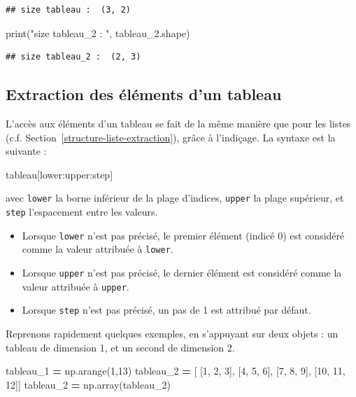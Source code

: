 \documentclass[
  12pt,
]{book}
\newenvironment{Shaded}{\begin{snugshade}}{\end{snugshade}}
\newcommand{\BuiltInTok}[1]{#1}
\newcommand{\DecValTok}[1]{\textcolor[rgb]{0.00,0.00,0.81}{#1}}
\newcommand{\NormalTok}[1]{#1}
\newcommand{\OperatorTok}[1]{\textcolor[rgb]{0.81,0.36,0.00}{\textbf{#1}}}
\newcommand{\StringTok}[1]{\textcolor[rgb]{0.31,0.60,0.02}{#1}}
\providecommand{\tightlist}{%
  \setlength{\itemsep}{0pt}\setlength{\parskip}{0pt}}
\numberwithin{equation}{section}
\numberwithin{countremarque}{section}
\begin{document}
\begin{lstlisting}
## size tableau :  (3, 2)
\end{lstlisting}

\begin{Shaded}
\begin{Highlighting}[]
\BuiltInTok{print}\NormalTok{(}\StringTok{"size tableau\_2 : "}\NormalTok{, tableau\_2.shape)}
\end{Highlighting}
\end{Shaded}

\begin{lstlisting}
## size tableau_2 :  (2, 3)
\end{lstlisting}

\subsection{Extraction des éléments d'un tableau}\label{extraction-des-uxe9luxe9ments-dun-tableau}

L'accès aux éléments d'un tableau se fait de la même manière que pour les listes (c.f. Section~\ref{structure-liste-extraction}), grâce à l'indiçage. La syntaxe est la suivante :

\begin{Shaded}
\begin{Highlighting}[]
\NormalTok{tableau[lower:upper:step]}
\end{Highlighting}
\end{Shaded}

avec \texttt{lower} la borne inférieur de la plage d'indices, \texttt{upper} la plage supérieur, et \texttt{step} l'espacement entre les valeurs.

\begin{itemize}
\tightlist
\item
  Lorsque \texttt{lower} n'est pas précisé, le premier élément (indicé 0) est considéré comme la valeur attribuée à \texttt{lower}.
\item
  Lorsque \texttt{upper} n'est pas précisé, le dernier élément est considéré comme la valeur attribuée à \texttt{upper}.
\item
  Lorsque \texttt{step} n'est pas précisé, un pas de 1 est attribué par défaut.
\end{itemize}

Reprenons rapidement quelques exemples, en s'appuyant sur deux objets : un tableau de dimension 1, et un second de dimension 2.

\begin{Shaded}
\begin{Highlighting}[]
\NormalTok{tableau\_1 }\OperatorTok{=}\NormalTok{ np.arange(}\DecValTok{1}\NormalTok{,}\DecValTok{13}\NormalTok{)}
\NormalTok{tableau\_2 }\OperatorTok{=}\NormalTok{ [ [}\DecValTok{1}\NormalTok{, }\DecValTok{2}\NormalTok{, }\DecValTok{3}\NormalTok{], [}\DecValTok{4}\NormalTok{, }\DecValTok{5}\NormalTok{, }\DecValTok{6}\NormalTok{], [}\DecValTok{7}\NormalTok{, }\DecValTok{8}\NormalTok{, }\DecValTok{9}\NormalTok{], [}\DecValTok{10}\NormalTok{, }\DecValTok{11}\NormalTok{, }\DecValTok{12}\NormalTok{]]}
\NormalTok{tableau\_2 }\OperatorTok{=}\NormalTok{ np.array(tableau\_2)}
\end{Highlighting}
\end{Shaded}
\end{document}
